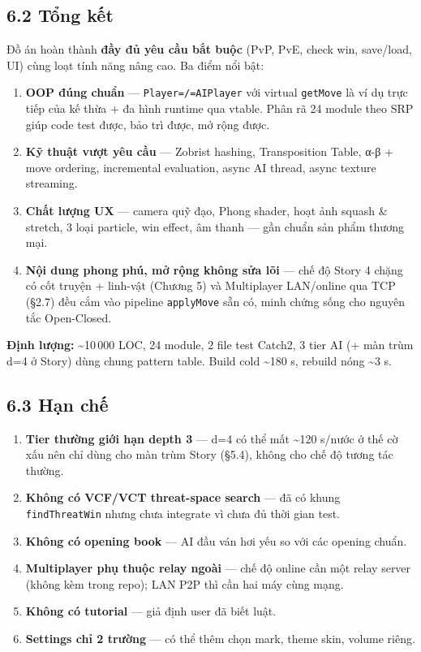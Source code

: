 \documentclass[11pt,a4paper]{article}
\begin{document}
\subsection{6.2 Tổng kết}
\label{sec:orgad88771}

Đồ án hoàn thành \textbf{đầy đủ yêu cầu bắt buộc} (PvP, PvE, check win, save/load, UI) cùng loạt tính năng nâng cao. Ba điểm nổi bật:

\begin{enumerate}
\item \textbf{OOP đúng chuẩn} — \texttt{Player=/=AIPlayer} với virtual \texttt{getMove} là ví dụ trực tiếp của kế thừa + đa hình runtime qua vtable. Phân rã 24 module theo SRP giúp code test được, bảo trì được, mở rộng được.

\item \textbf{Kỹ thuật vượt yêu cầu} — Zobrist hashing, Transposition Table, α-β + move ordering, incremental evaluation, async AI thread, async texture streaming.

\item \textbf{Chất lượng UX} — camera quỹ đạo, Phong shader, hoạt ảnh squash \& stretch, 3 loại particle, win effect, âm thanh — gần chuẩn sản phẩm thương mại.

\item \textbf{Nội dung phong phú, mở rộng không sửa lõi} — chế độ Story 4 chặng có cốt truyện + linh-vật (Chương 5) và Multiplayer LAN/online qua TCP (§2.7) đều cắm vào pipeline \texttt{applyMove} sẵn có, minh chứng sống cho nguyên tắc Open-Closed.
\end{enumerate}

\textbf{Định lượng:} \textasciitilde{}10\,000 LOC, 24 module, 2 file test Catch2, 3 tier AI (+ màn trùm d=4 ở Story) dùng chung pattern table. Build cold \textasciitilde{}180 s, rebuild nóng \textasciitilde{}3 s.
\subsection{6.3 Hạn chế}
\label{sec:org44bfed1}

\begin{enumerate}
\item \textbf{Tier thường giới hạn depth 3} — d=4 có thể mất \textasciitilde{}120 s/nước ở thế cờ xấu nên chỉ dùng cho màn trùm Story (§5.4), không cho chế độ tương tác thường.
\item \textbf{Không có VCF/VCT threat-space search} — đã có khung \texttt{findThreatWin} nhưng chưa integrate vì chưa đủ thời gian test.
\item \textbf{Không có opening book} — AI đầu ván hơi yếu so với các opening chuẩn.
\item \textbf{Multiplayer phụ thuộc relay ngoài} — chế độ online cần một relay server (không kèm trong repo); LAN P2P thì cần hai máy cùng mạng.
\item \textbf{Không có tutorial} — giả định user đã biết luật.
\item \textbf{Settings chỉ 2 trường} — có thể thêm chọn mark, theme skin, volume riêng.
\end{enumerate}
\end{document}
